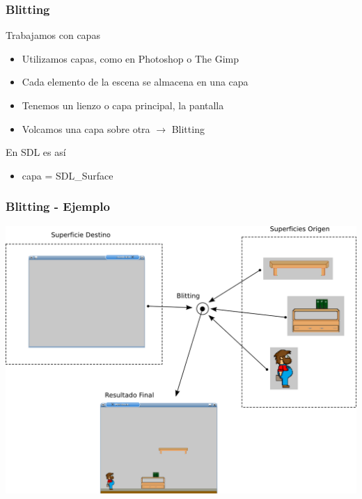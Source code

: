 \begin{frame}
    \frametitle{Blitting}
    
    
    \begin{block}{Trabajamos con capas}
        \begin{itemize}
            \item Utilizamos capas, como en Photoshop o The Gimp
            \item Cada elemento de la escena se almacena en una capa
            \item Tenemos un lienzo o capa principal, la pantalla
            \item Volcamos una capa sobre otra $\rightarrow$ Blitting
        \end{itemize}            
    \end{block}
    
    \begin{alertblock}{En SDL es así}
        \begin{itemize}
            \item capa = SDL\_Surface
        \end{itemize}            
    \end{alertblock}

\end{frame}


\begin{frame}
    \frametitle{Blitting - Ejemplo}

    \begin{center}
		\includegraphics[scale=0.5]{img/Blitting.png}
	\end{center}
    
\end{frame}

